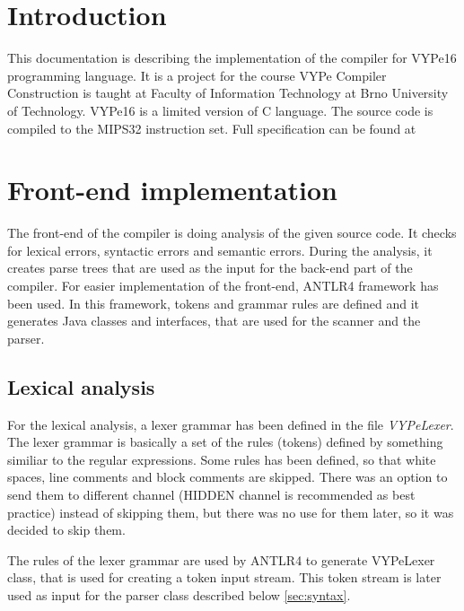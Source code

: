 
\section{Introduction}
This documentation is describing the implementation of the compiler for VYPe16 programming language. It is a project for the course VYPe Compiler Construction is taught at Faculty of Information Technology at Brno University of Technology. VYPe16 is a limited version of C language. The source code is compiled to the MIPS32 instruction set. Full specification can be found at 

\section{Front-end implementation}
The front-end of the compiler is doing analysis of the given source code. It checks for lexical errors, syntactic errors and semantic errors. During the analysis, it creates parse trees that are used as the input for the back-end part of the compiler. For easier implementation of the front-end, ANTLR4 framework has been used. In this framework, tokens and grammar rules are defined and it generates Java classes and interfaces, that are used for the scanner and the parser.

\subsection{Lexical analysis}
For the lexical analysis, a lexer grammar has been defined in the file \textit{VYPeLexer}. The lexer grammar is basically a set of the rules (tokens) defined by something similiar to the regular expressions. Some rules has been defined, so that white spaces, line comments and block comments are skipped. There was an option to send them to different channel (HIDDEN channel is recommended as best practice) instead of skipping them, but there was no use for them later, so it was decided to skip them.

The rules of the lexer grammar are used by ANTLR4 to generate VYPeLexer class, that is used for creating a token input stream. This token stream is later used as input for the parser class described below \ref{sec:syntax}.

